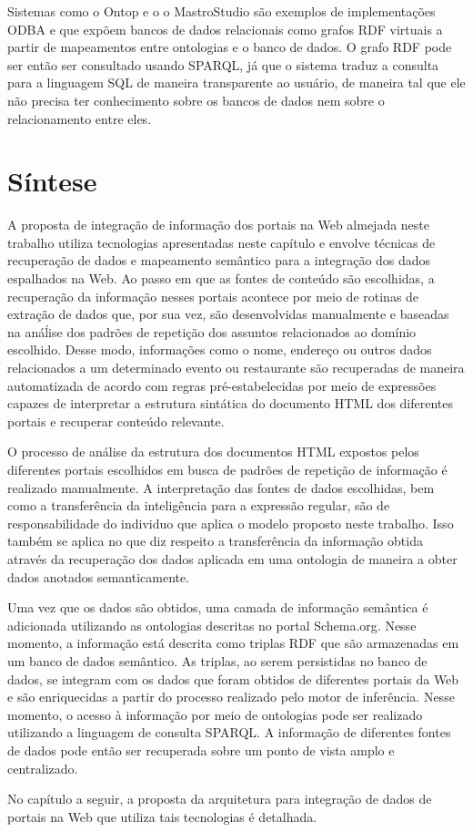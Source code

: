 Sistemas como o Ontop \citep{RodriguezMuro2013OntopAW, Calvanese2016} e o o MastroStudio \citep{Civili2013} são exemplos de implementações ODBA e que expõem bancos de dados relacionais como grafos RDF virtuais a partir de mapeamentos entre ontologias e o banco de dados. O grafo RDF pode ser então ser consultado usando SPARQL, já que o sistema traduz a consulta para a linguagem SQL de maneira transparente ao usuário, de maneira tal que ele não precisa ter conhecimento sobre os bancos de dados nem sobre o relacionamento entre eles.

\section{Síntese}

A proposta de integração de informação dos portais na Web almejada neste trabalho utiliza tecnologias apresentadas neste capítulo e envolve técnicas de recuperação de dados e mapeamento semântico para a integração dos dados espalhados na Web. Ao passo em que as fontes de conteúdo são escolhidas, a recuperação da informação nesses portais acontece por meio de rotinas de extração de dados que, por sua vez, são desenvolvidas manualmente e baseadas na anáĺise dos padrões de repetição dos assuntos relacionados ao domínio escolhido. Desse modo, informações como o nome, endereço ou outros dados relacionados a um determinado evento ou restaurante são recuperadas de maneira automatizada de acordo com regras pré-estabelecidas por meio de expressões capazes de interpretar a estrutura sintática do documento HTML dos diferentes portais e recuperar conteúdo relevante.

O processo de análise da estrutura dos documentos HTML expostos pelos diferentes portais escolhidos em busca de padrões de repetição de informação é realizado manualmente. A interpretação das fontes de dados escolhidas, bem como a transferência da inteligência para a expressão regular, são de responsabilidade do individuo que aplica o modelo proposto neste trabalho. Isso também se aplica no que diz respeito a transferência da informação obtida através da recuperação dos dados aplicada em uma ontologia de maneira a obter dados anotados semanticamente.

Uma vez que os dados são obtidos, uma camada de informação semântica é adicionada utilizando as ontologias descritas no portal Schema.org. Nesse momento, a informação está descrita como triplas RDF que são armazenadas em um banco de dados semântico. As triplas, ao serem persistidas no banco de dados, se integram com os dados que foram obtidos de diferentes portais da Web e são enriquecidas a partir do processo realizado pelo motor de inferência. Nesse momento, o acesso à informação por meio de ontologias pode ser realizado utilizando a linguagem de consulta SPARQL. A informação de diferentes fontes de dados pode então ser recuperada sobre um ponto de vista amplo e centralizado.

No capítulo a seguir, a proposta da arquitetura para integração de dados de portais na Web que utiliza tais tecnologias é detalhada.





